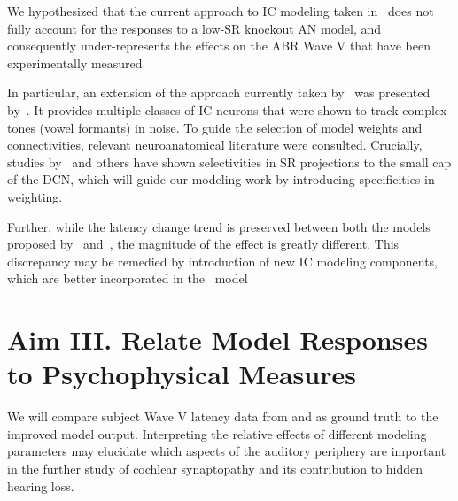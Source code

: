 We hypothesized that the current approach to IC modeling taken in~\cite{Verhulst2015Functional,Mehraei2016Auditory} does not fully account for the responses to a low-SR knockout AN model, and consequently under-represents the effects on the ABR Wave V that have been experimentally measured.  

In particular, an extension of the approach currently taken by~\cite{Verhulst2015Functional} was presented by~\cite{Carney2015Speech}.  It provides multiple classes of IC neurons that were shown to track complex tones (vowel formants) in noise.  To guide the selection of model weights and connectivities, relevant neuroanatomical literature were consulted.  Crucially, studies by~\cite{Ryugo2008Projections} and others have shown selectivities in SR projections to the small cap of the DCN, which will guide  our modeling work by introducing specificities in weighting. 

Further, while the latency change trend is preserved between both the models proposed by~\cite{Zilany2014Updated} and~\cite{Verhulst2015Functional}, the magnitude of the effect is greatly different.  This discrepancy may be remedied by introduction of new IC modeling components, which are better incorporated in the~\cite{Zilany2014Updated} model

\section{Aim III. Relate Model Responses to Psychophysical Measures}

We will compare subject Wave V latency data from \cite{Mehraei2015Auditory} and \cite{Mehraei2015Individual} as ground truth to the improved model output.  Interpreting the relative effects of different modeling parameters may elucidate which aspects of the auditory periphery are important in the further study of cochlear synaptopathy and its contribution to hidden hearing loss. 